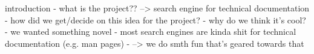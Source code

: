 introduction
  - what is the project?? --> search engine for technical documentation
  - how did we get/decide on this idea for the project?
  - why do we think it's cool?
  - we wanted something novel
  - most search engines are kinda shit for technical documentation (e.g. man pages)
  - --> we do smth fun that's geared towards that
